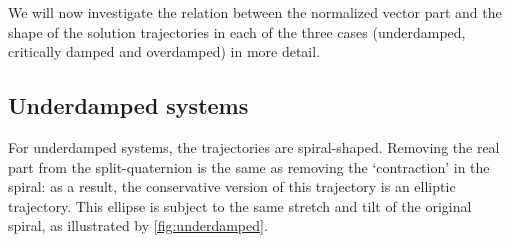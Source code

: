 We will now investigate the relation between the normalized vector part and the shape of the solution trajectories in each of the three cases (underdamped, critically damped and overdamped) in more detail.


\subsection{Underdamped systems}
For underdamped systems, the trajectories are spiral-shaped. Removing the real part from the split-quaternion is the same as removing the `contraction' in the spiral: as a result, the conservative version of this trajectory is an elliptic trajectory. This ellipse is subject to the same stretch and tilt of the original spiral, as illustrated by \cref{fig:underdamped}. 

